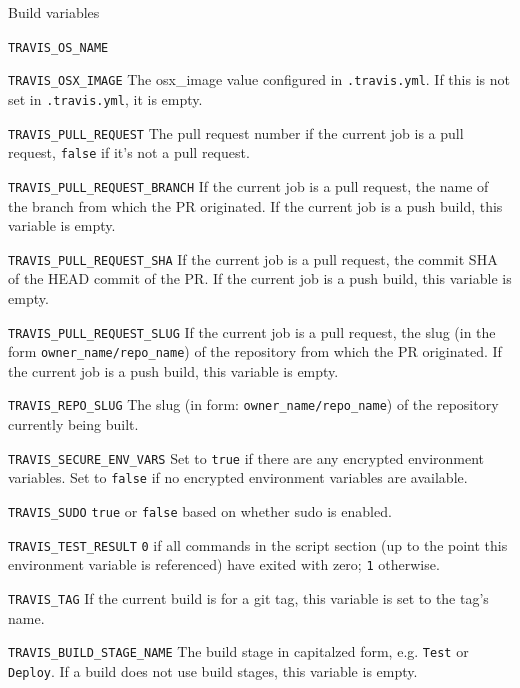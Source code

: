 \documentclass[presentation]{beamer}
\begin{document}
\begin{frame}[allowframebreaks]{Build variables}
\begin{block}{\texttt{TRAVIS\_OS\_NAME}}
    \end{block}
    \begin{block}{\texttt{TRAVIS\_OSX\_IMAGE}}
        The osx\_image value configured in \texttt{.travis.yml}. If this is not set in \texttt{.travis.yml}, it is empty.
    \end{block}
    \begin{block}{\texttt{TRAVIS\_PULL\_REQUEST}}
        The pull request number if the current job is a pull request, \texttt{false} if it’s not a pull request.
    \end{block}
    \begin{block}{\texttt{TRAVIS\_PULL\_REQUEST\_BRANCH}}
        If the current job is a pull request, the name of the branch from which the PR originated.
        If the current job is a push build, this variable is empty.
    \end{block}
    \begin{block}{\texttt{TRAVIS\_PULL\_REQUEST\_SHA}}
        If the current job is a pull request, the commit SHA of the HEAD commit of the PR.
        If the current job is a push build, this variable is empty.
    \end{block}
    \begin{block}{\texttt{TRAVIS\_PULL\_REQUEST\_SLUG}}
        If the current job is a pull request, the slug (in the form \texttt{owner\_name/repo\_name}) of the repository from which the PR originated.
        If the current job is a push build, this variable is empty.
    \end{block}
    \begin{block}{\texttt{TRAVIS\_REPO\_SLUG}}
        The slug (in form: \texttt{owner\_name/repo\_name}) of the repository currently being built.
    \end{block}
    \begin{block}{\texttt{TRAVIS\_SECURE\_ENV\_VARS}}
        Set to \texttt{true} if there are any encrypted environment variables.
        Set to \texttt{false} if no encrypted environment variables are available.
    \end{block}
    \begin{block}{\texttt{TRAVIS\_SUDO}}
        \texttt{true} or \texttt{false} based on whether sudo is enabled.
    \end{block}
    \begin{block}{\texttt{TRAVIS\_TEST\_RESULT}}
        \texttt{0} if all commands in the script section (up to the point this environment variable is referenced) have exited with zero; \texttt{1} otherwise.
    \end{block}
    \begin{block}{\texttt{TRAVIS\_TAG}}
        If the current build is for a git tag, this variable is set to the tag's name.
    \end{block}
    \begin{block}{\texttt{TRAVIS\_BUILD\_STAGE\_NAME}}
        The build stage in capitalzed form, e.g. \texttt{Test} or \texttt{Deploy}. If a build does not use build stages, this variable is empty.
    \end{block}
\end{frame}
\end{document}
